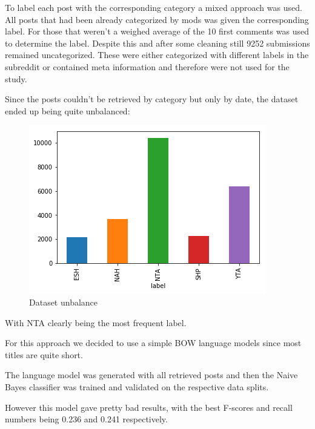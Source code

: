 \documentclass[11pt,a4paper]{article}
\begin{document}
To label each post with the corresponding category a mixed approach was used. All posts that had been already categorized by mods was given the corresponding label. For those that weren't a weighed average of the 10 first comments was used to determine the label. Despite this and after some cleaning still 9252 submissions remained uncategorized. These were either categorized with different labels in the subreddit or contained meta information and therefore were not used for the study.

Since the posts couldn't be retrieved by category but only by date, the dataset ended up being quite unbalanced:

\begin{figure}[h!] %
	\center
	\includegraphics[scale=0.5]{unbalance.png}
	\caption{Dataset unbalance}
\end{figure}

With NTA clearly being the most frequent label.

For this approach we decided to use a simple BOW language models since most titles are quite short. 

The language model was generated with all retrieved posts and then the Naive Bayes classifier was trained and validated on the respective data splits.

However this model gave pretty bad results, with the best F-scores and recall numbers being 0.236 and 0.241 respectively.
\end{document}
